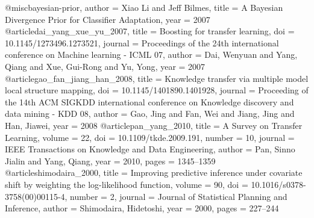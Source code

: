 @misc{bayesian-prior,
  author = {Xiao Li and Jeff Bilmes},
  title  = {A Bayesian Divergence Prior for Classifier Adaptation},
  year   = {2007}
}
@article{dai_yang_xue_yu_2007,
  title   = {Boosting for transfer learning},
  doi     = {10.1145/1273496.1273521},
  journal = {Proceedings of the 24th international conference on Machine learning - ICML 07},
  author  = {Dai, Wenyuan and Yang, Qiang and Xue, Gui-Rong and Yu, Yong},
  year    = {2007}
}@article{gao_fan_jiang_han_2008,
  title   = {Knowledge transfer via multiple model local structure mapping},
  doi     = {10.1145/1401890.1401928},
  journal = {Proceeding of the 14th ACM SIGKDD international conference on Knowledge discovery and data mining - KDD 08},
  author  = {Gao, Jing and Fan, Wei and Jiang, Jing and Han, Jiawei},
  year    = {2008}
}
@article{pan_yang_2010,
  title   = {A Survey on Transfer Learning},
  volume  = {22},
  doi     = {10.1109/tkde.2009.191},
  number  = {10},
  journal = {IEEE Transactions on Knowledge and Data Engineering},
  author  = {Pan, Sinno Jialin and Yang, Qiang},
  year    = {2010},
  pages   = {1345–1359}
}
@article{shimodaira_2000,
  title   = {Improving predictive inference under covariate shift by weighting the log-likelihood function},
  volume  = {90},
  doi     = {10.1016/s0378-3758(00)00115-4},
  number  = {2},
  journal = {Journal of Statistical Planning and Inference},
  author  = {Shimodaira, Hidetoshi},
  year    = {2000},
  pages   = {227–244}
}